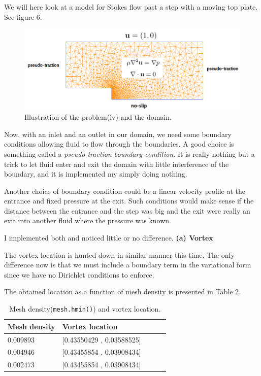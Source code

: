 \documentclass[11pt,a4paper,english]{article}
\numberwithin{equation}{section}
\begin{document}
We will here look at a model for Stokes flow past a step with a moving top plate. See figure 6.

\begin{figure}[h!]
\begin{center}
  \includegraphics[scale=0.3]{stokes_step.png}
  \end{center}
  \caption{Illustration of the problem(iv) and the domain.}
\end{figure}

Now, with an inlet and an outlet in our domain, we need some boundary conditions allowing fluid to flow through the boundaries. A good choice is something called a \emph{pseudo-traction boundary condition}. It is really nothing but a trick to let fluid enter and exit the domain with little interference of the boundary, and it is implemented my simply doing nothing. 

Another choice of boundary condition could be a linear velocity profile at the entrance and fixed pressure at the exit. Such conditions would make sense if the distance between the entrance and the step was big and the exit were really an exit into another fluid where the pressure was known. 

I implemented both and noticed little or no difference. 
\newpage
\textbf{(a) Vortex}

The vortex location is hunted down in similar manner this time. The only difference now is that we must include a boundary term in the variational form since we have no Dirichlet conditions to enforce.

The obtained location as a function of mesh density is presented in Table 2.

\begin{table}[H]
\centering
\caption{ Mesh density(\texttt{mesh.hmin()}) and vortex location. }
\vspace{3mm}
\begin{tabular}{|l|l|l|l|l|}
\hline
\textbf{Mesh density} & \textbf{Vortex location}    \\
\hline
0.009893 & [0.43550429 , 0.03588525]   \\
\hline
0.004946 & [0.43455854 , 0.03908434]	   \\
\hline
0.002473 & [0.43455854 , 0.03908434]    \\ 
\hline
\end{tabular}
\label{tab:time}
\end{table}
\end{document}
